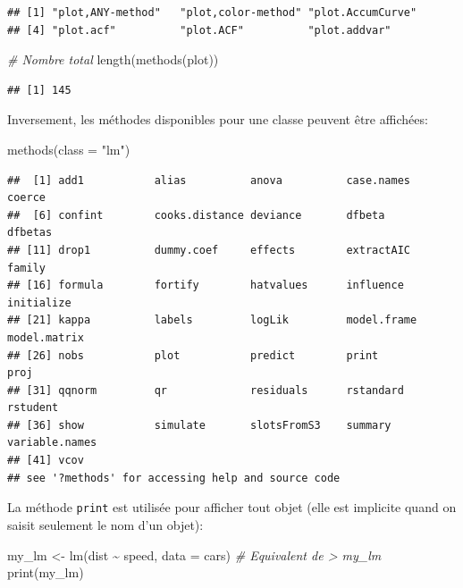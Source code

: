 \documentclass[
  11pt,
  french,
  a4paper,
  extrafontsizes,onecolumn,openright
  ]{memoir}
\newenvironment{Shaded}{\begin{snugshade}}{\end{snugshade}}
\newcommand{\AttributeTok}[1]{\textcolor[rgb]{0.77,0.63,0.00}{#1}}
\newcommand{\CommentTok}[1]{\textcolor[rgb]{0.56,0.35,0.01}{\textit{#1}}}
\newcommand{\FunctionTok}[1]{\textcolor[rgb]{0.00,0.00,0.00}{#1}}
\newcommand{\NormalTok}[1]{#1}
\newcommand{\OtherTok}[1]{\textcolor[rgb]{0.56,0.35,0.01}{#1}}
\newcommand{\SpecialCharTok}[1]{\textcolor[rgb]{0.00,0.00,0.00}{#1}}
\newcommand{\StringTok}[1]{\textcolor[rgb]{0.31,0.60,0.02}{#1}}
\begin{document}
\begin{verbatim}
## [1] "plot,ANY-method"   "plot,color-method" "plot.AccumCurve"  
## [4] "plot.acf"          "plot.ACF"          "plot.addvar"
\end{verbatim}

\begin{Shaded}
\begin{Highlighting}[]
\CommentTok{\# Nombre total}
\FunctionTok{length}\NormalTok{(}\FunctionTok{methods}\NormalTok{(plot))}
\end{Highlighting}
\end{Shaded}

\begin{verbatim}
## [1] 145
\end{verbatim}

\normalsize
Inversement, les méthodes disponibles pour une classe peuvent être affichées:

\scriptsize

\begin{Shaded}
\begin{Highlighting}[]
\FunctionTok{methods}\NormalTok{(}\AttributeTok{class =} \StringTok{"lm"}\NormalTok{)}
\end{Highlighting}
\end{Shaded}

\begin{verbatim}
##  [1] add1           alias          anova          case.names     coerce        
##  [6] confint        cooks.distance deviance       dfbeta         dfbetas       
## [11] drop1          dummy.coef     effects        extractAIC     family        
## [16] formula        fortify        hatvalues      influence      initialize    
## [21] kappa          labels         logLik         model.frame    model.matrix  
## [26] nobs           plot           predict        print          proj          
## [31] qqnorm         qr             residuals      rstandard      rstudent      
## [36] show           simulate       slotsFromS3    summary        variable.names
## [41] vcov          
## see '?methods' for accessing help and source code
\end{verbatim}

\normalsize
La méthode \texttt{print} est utilisée pour afficher tout objet (elle est implicite quand on saisit seulement le nom d'un objet):

\scriptsize

\begin{Shaded}
\begin{Highlighting}[]
\NormalTok{my\_lm }\OtherTok{\textless{}{-}} \FunctionTok{lm}\NormalTok{(dist }\SpecialCharTok{\textasciitilde{}}\NormalTok{ speed, }\AttributeTok{data =}\NormalTok{ cars)}
\CommentTok{\# Equivalent de \textquotesingle{}\textgreater{} my\_lm\textquotesingle{}}
\FunctionTok{print}\NormalTok{(my\_lm)}
\end{Highlighting}
\end{Shaded}
\end{document}
